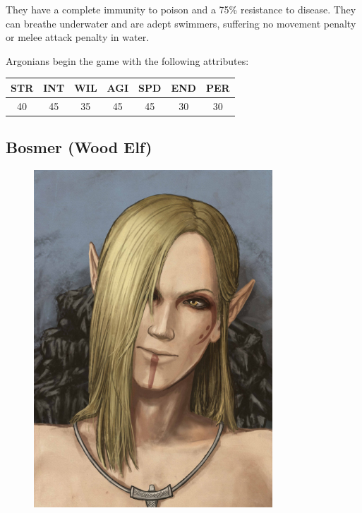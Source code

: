 \documentclass[12pt]{book}
\begin{document}
They have a complete immunity to poison and a 75\% resistance to disease. They can breathe underwater and are adept swimmers, suffering no movement penalty or melee attack penalty in water.

Argonians begin the game with the following attributes:

\begin{center}
\begin{tabular}{|c|c|c|c|c|c|c|}
\hline
STR & INT & WIL & AGI & SPD & END & PER\\ \hline
40 & 45 & 35 & 45 & 45 & 30 & 30\\ \hline
\end{tabular}
\end{center}

\subsection{Bosmer (Wood Elf)}
\begin{figure}
	\includegraphics[width=\textwidth]{Bosmer.png}
\end{figure}
\end{document}
